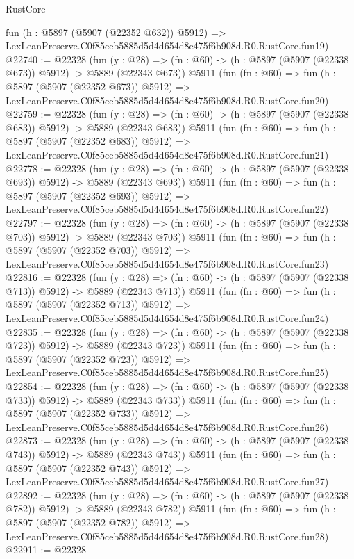 \begin{lexlean}{RustCore}
\begin{coremodule}
    fun (h : @5897 (@5907 (@22352 @632)) @5912) =>
    LexLeanPreserve.C0f85ceb5885d5d4d654d8e475f6b908d.R0.RustCore.fun19)
@22740 := @22328
    (fun (y : @28) => (fn : @60) -> (h : @5897 (@5907 (@22338 @673)) @5912) -> @5889 (@22343 @673))
    @5911
    (fun (fn : @60) =>
    fun (h : @5897 (@5907 (@22352 @673)) @5912) =>
    LexLeanPreserve.C0f85ceb5885d5d4d654d8e475f6b908d.R0.RustCore.fun20)
@22759 := @22328
    (fun (y : @28) => (fn : @60) -> (h : @5897 (@5907 (@22338 @683)) @5912) -> @5889 (@22343 @683))
    @5911
    (fun (fn : @60) =>
    fun (h : @5897 (@5907 (@22352 @683)) @5912) =>
    LexLeanPreserve.C0f85ceb5885d5d4d654d8e475f6b908d.R0.RustCore.fun21)
@22778 := @22328
    (fun (y : @28) => (fn : @60) -> (h : @5897 (@5907 (@22338 @693)) @5912) -> @5889 (@22343 @693))
    @5911
    (fun (fn : @60) =>
    fun (h : @5897 (@5907 (@22352 @693)) @5912) =>
    LexLeanPreserve.C0f85ceb5885d5d4d654d8e475f6b908d.R0.RustCore.fun22)
@22797 := @22328
    (fun (y : @28) => (fn : @60) -> (h : @5897 (@5907 (@22338 @703)) @5912) -> @5889 (@22343 @703))
    @5911
    (fun (fn : @60) =>
    fun (h : @5897 (@5907 (@22352 @703)) @5912) =>
    LexLeanPreserve.C0f85ceb5885d5d4d654d8e475f6b908d.R0.RustCore.fun23)
@22816 := @22328
    (fun (y : @28) => (fn : @60) -> (h : @5897 (@5907 (@22338 @713)) @5912) -> @5889 (@22343 @713))
    @5911
    (fun (fn : @60) =>
    fun (h : @5897 (@5907 (@22352 @713)) @5912) =>
    LexLeanPreserve.C0f85ceb5885d5d4d654d8e475f6b908d.R0.RustCore.fun24)
@22835 := @22328
    (fun (y : @28) => (fn : @60) -> (h : @5897 (@5907 (@22338 @723)) @5912) -> @5889 (@22343 @723))
    @5911
    (fun (fn : @60) =>
    fun (h : @5897 (@5907 (@22352 @723)) @5912) =>
    LexLeanPreserve.C0f85ceb5885d5d4d654d8e475f6b908d.R0.RustCore.fun25)
@22854 := @22328
    (fun (y : @28) => (fn : @60) -> (h : @5897 (@5907 (@22338 @733)) @5912) -> @5889 (@22343 @733))
    @5911
    (fun (fn : @60) =>
    fun (h : @5897 (@5907 (@22352 @733)) @5912) =>
    LexLeanPreserve.C0f85ceb5885d5d4d654d8e475f6b908d.R0.RustCore.fun26)
@22873 := @22328
    (fun (y : @28) => (fn : @60) -> (h : @5897 (@5907 (@22338 @743)) @5912) -> @5889 (@22343 @743))
    @5911
    (fun (fn : @60) =>
    fun (h : @5897 (@5907 (@22352 @743)) @5912) =>
    LexLeanPreserve.C0f85ceb5885d5d4d654d8e475f6b908d.R0.RustCore.fun27)
@22892 := @22328
    (fun (y : @28) => (fn : @60) -> (h : @5897 (@5907 (@22338 @782)) @5912) -> @5889 (@22343 @782))
    @5911
    (fun (fn : @60) =>
    fun (h : @5897 (@5907 (@22352 @782)) @5912) =>
    LexLeanPreserve.C0f85ceb5885d5d4d654d8e475f6b908d.R0.RustCore.fun28)
@22911 := @22328

\end{coremodule}
\end{lexlean}
